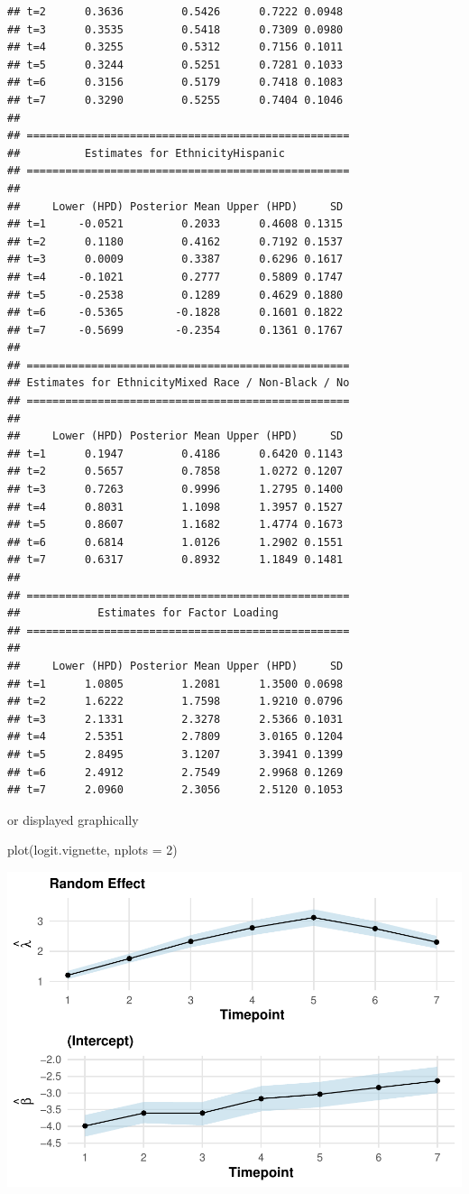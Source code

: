 \documentclass[a4paper, preprint, 3p,
authoryear]{elsarticle} %
\newenvironment{Shaded}{\begin{snugshade}}{\end{snugshade}}
\newcommand{\NormalTok}[1]{#1}
\begin{document}
\begin{verbatim}
## t=2      0.3636         0.5426      0.7222 0.0948
## t=3      0.3535         0.5418      0.7309 0.0980
## t=4      0.3255         0.5312      0.7156 0.1011
## t=5      0.3244         0.5251      0.7281 0.1033
## t=6      0.3156         0.5179      0.7418 0.1083
## t=7      0.3290         0.5255      0.7404 0.1046
## 
## ==================================================
##          Estimates for EthnicityHispanic
## ==================================================
## 
##     Lower (HPD) Posterior Mean Upper (HPD)     SD
## t=1     -0.0521         0.2033      0.4608 0.1315
## t=2      0.1180         0.4162      0.7192 0.1537
## t=3      0.0009         0.3387      0.6296 0.1617
## t=4     -0.1021         0.2777      0.5809 0.1747
## t=5     -0.2538         0.1289      0.4629 0.1880
## t=6     -0.5365        -0.1828      0.1601 0.1822
## t=7     -0.5699        -0.2354      0.1361 0.1767
## 
## ==================================================
## Estimates for EthnicityMixed Race / Non-Black / No
## ==================================================
## 
##     Lower (HPD) Posterior Mean Upper (HPD)     SD
## t=1      0.1947         0.4186      0.6420 0.1143
## t=2      0.5657         0.7858      1.0272 0.1207
## t=3      0.7263         0.9996      1.2795 0.1400
## t=4      0.8031         1.1098      1.3957 0.1527
## t=5      0.8607         1.1682      1.4774 0.1673
## t=6      0.6814         1.0126      1.2902 0.1551
## t=7      0.6317         0.8932      1.1849 0.1481
## 
## ==================================================
##            Estimates for Factor Loading
## ==================================================
## 
##     Lower (HPD) Posterior Mean Upper (HPD)     SD
## t=1      1.0805         1.2081      1.3500 0.0698
## t=2      1.6222         1.7598      1.9210 0.0796
## t=3      2.1331         2.3278      2.5366 0.1031
## t=4      2.5351         2.7809      3.0165 0.1204
## t=5      2.8495         3.1207      3.3941 0.1399
## t=6      2.4912         2.7549      2.9968 0.1269
## t=7      2.0960         2.3056      2.5120 0.1053
\end{verbatim}

or displayed graphically

\begin{Shaded}
\begin{Highlighting}[]
\NormalTok{plot(logit.vignette, nplots = 2)}
\end{Highlighting}
\end{Shaded}

\includegraphics[width=0.7\linewidth]{Vignette-for-panelTVP_files/figure-latex/unnamed-chunk-34-1}
\end{document}
